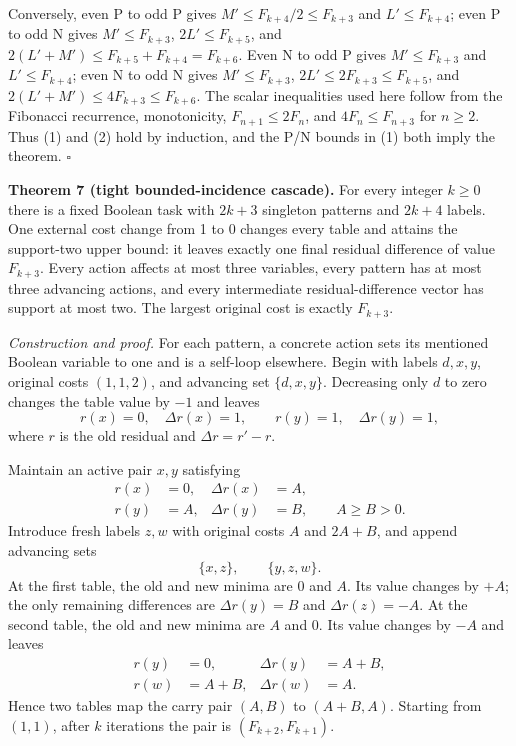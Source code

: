 Conversely, even P to odd P gives
$M'\leq F_{k+4}/2\leq F_{k+3}$ and $L'\leq F_{k+4}$; even P to odd N gives
$M'\leq F_{k+3}$,
$2L'\leq F_{k+5}$, and
$2(L'+M')\leq F_{k+5}+F_{k+4}=F_{k+6}$.
Even N to odd P gives $M'\leq F_{k+3}$ and $L'\leq F_{k+4}$; even N to odd N gives
$M'\leq F_{k+3}$,
$2L'\leq2F_{k+3}\leq F_{k+5}$, and
$2(L'+M')\leq4F_{k+3}\leq F_{k+6}$.
The scalar inequalities used here follow from the Fibonacci recurrence, monotonicity, $F_{n+1}\leq2F_n$, and $4F_n\leq F_{n+3}$ for $n\geq2$. Thus (1) and (2) hold by induction, and the P/N bounds in (1) both imply the theorem. $\square$

\textbf{Theorem 7 (tight bounded-incidence cascade).} For every integer $k\geq0$ there is a fixed Boolean task with $2k+3$ singleton patterns and $2k+4$ labels. One external cost change from 1 to 0 changes every table and attains the support-two upper bound: it leaves exactly one final residual difference of value $F_{k+3}$. Every action affects at most three variables, every pattern has at most three advancing actions, and every intermediate residual-difference vector has support at most two. The largest original cost is exactly $F_{k+3}$.

\textit{Construction and proof.} For each pattern, a concrete action sets its mentioned Boolean variable to one and is a self-loop elsewhere. Begin with labels $d,x,y$, original costs $(1,1,2)$, and advancing set $\{d,x,y\}$. Decreasing only $d$ to zero changes the table value by $-1$ and leaves
\[
 r(x)=0,\quad \Delta r(x)=1,\qquad
 r(y)=1,\quad \Delta r(y)=1,
\]
where $r$ is the old residual and $\Delta r=r'-r$.

Maintain an active pair $x,y$ satisfying
\[
\begin{aligned}
 r(x)&=0,& \Delta r(x)&=A,\\
 r(y)&=A,& \Delta r(y)&=B,\qquad A\geq B>0.
\end{aligned}
\]
Introduce fresh labels $z,w$ with original costs $A$ and $2A+B$, and append advancing sets
\[
 \{x,z\},\qquad \{y,z,w\}.
\]
At the first table, the old and new minima are $0$ and $A$. Its value changes by $+A$; the only remaining differences are $\Delta r(y)=B$ and $\Delta r(z)=-A$. At the second table, the old and new minima are $A$ and $0$. Its value changes by $-A$ and leaves
\[
\begin{aligned}
 r(y)&=0,& \Delta r(y)&=A+B,\\
 r(w)&=A+B,& \Delta r(w)&=A.
\end{aligned}
\]
Hence two tables map the carry pair $(A,B)$ to $(A+B,A)$. Starting from $(1,1)$, after $k$ iterations the pair is $(F_{k+2},F_{k+1})$.

